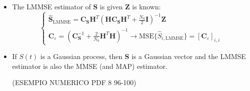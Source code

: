 \begin{itemize}
\begin{align*}
&\mathbf{W}\in\mathcal{N}\left(\mathbf{0}, \frac{N_0}{2}\mathbf{I}\right), \quad \mathbf{H} \text{ known}, \quad \boldsymbol{\eta}_{\mathbf{S}} = E\{\mathbf{S}\} = \mathbf{0}, \quad \mathbf{C}_{\mathbf{S}} = E\{\mathbf{S}\mathbf{S}^{T}\} \\[8pt]
&\left[\mathbf{C}_{\mathbf{S}}\right]_{i+1, k+1} = E\left\{S_i S_k\right\} = E\left\{\frac{1}{\sqrt{2B}}S\left(\frac{i}{2B}\right)\frac{1}{\sqrt{2B}}S\left(\frac{k}{2B}\right)\right\} = \frac{1}{2B}R_S\left(\frac{k-i}{2B}\right) \\[8pt]
&i, k = 0, 1, 2, \dots, N_s-1
\end{align*}
\item The LMMSE estimator of \textbf{S} is given \textbf{Z} is known:
$$
\begin{cases}
\hat{\mathbf{S}}_{\text{LMMSE}} = \mathbf{C}_{\mathbf{S}}\mathbf{H}^{T}\left(\mathbf{H}\mathbf{C}_{\mathbf{S}}\mathbf{H}^{T} + \frac{N_0}{2}\mathbf{I}\right)^{-1} \mathbf{Z} \\[8pt]
\mathbf{C}_{\varepsilon} = \left(\mathbf{C}_{\mathbf{S}}^{-1} + \frac{2}{N_0}\mathbf{H}^{T}\mathbf{H}\right)^{-1} \to \text{MSE}\{\hat{S}_{i,\text{LMMSE}}\} = [\mathbf{C}_{\varepsilon}]_{i,i}
\end{cases}
$$
\item If \(S(t)\) is a Gaussian process, then \textbf{S} is a Gaussian vector and the LMMSE estimator is also the MMSE (and MAP) estimator.

(ESEMPIO NUMERICO PDF 8 96-100)
\end{itemize}
